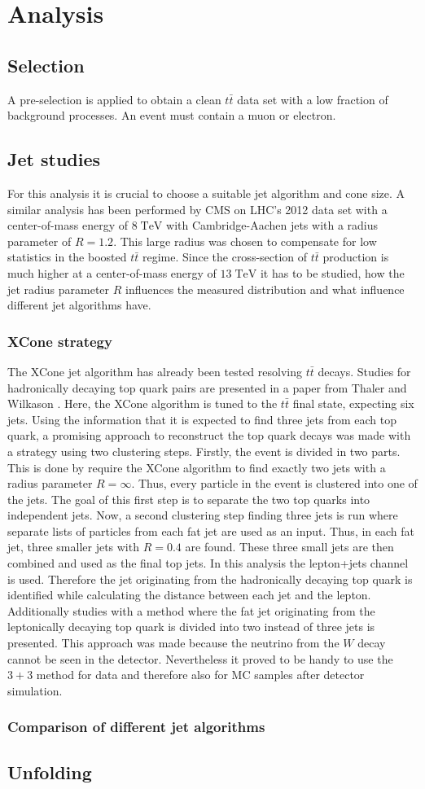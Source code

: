 \section{Analysis}
\subsection{Selection}
	A pre-selection is applied to obtain a clean $t\bar{t}$ data set with a low fraction of background processes. An event must contain a muon or electron.
\subsection{Jet studies}
	For this analysis it is crucial to choose a suitable jet algorithm and cone size. A similar analysis has been performed by CMS on LHC's 2012 data set with a center-of-mass energy of $8\;\text{TeV}$ with Cambridge-Aachen jets with a radius parameter of $R=1.2$. This large radius was chosen to compensate for low statistics in the boosted $t\bar{t}$ regime. Since the cross-section of $t\bar{t}$ production is much higher at a center-of-mass energy of $13\;\text{TeV}$ it has to be studied, how the jet radius parameter $R$ influences the measured distribution and what influence different jet algorithms have.
\subsubsection{XCone strategy}
	The XCone jet algorithm has already been tested resolving $t\bar{t}$ decays. Studies for hadronically decaying top quark pairs are presented in a paper from Thaler and Wilkason \cite{xconetop}. Here, the XCone algorithm is tuned to the $t\bar{t}$ final state, expecting six jets. Using the information that it is expected to find three jets from each top quark, a promising approach to reconstruct the top quark decays was made with a strategy using two clustering steps. Firstly, the event is divided in two parts. This is done by require the XCone algorithm to find exactly two jets with a radius parameter $R=\infty$. Thus, every particle in the event is clustered into one of the jets. The goal of this first step is to separate the two top quarks into independent jets. Now, a second clustering step finding three jets is run where separate lists of particles from each fat jet are used as an input. Thus, in each fat jet, three smaller jets with $R=0.4$ are found. These three small jets are then combined and used as the final top jets. 
	\newline In this analysis the lepton+jets channel is used. Therefore the jet originating from the hadronically decaying top quark is identified while calculating the distance between each jet and the lepton. Additionally studies with a method where the fat jet originating from the leptonically decaying top quark is divided into two instead of three jets is presented. This approach was made because the neutrino from the $W$ decay cannot be seen in the detector. Nevertheless it proved to be handy to use the $3+3$ method for data and therefore also for MC samples after detector simulation.   
	
\subsubsection{Comparison of different jet algorithms}
\subsection{Unfolding}